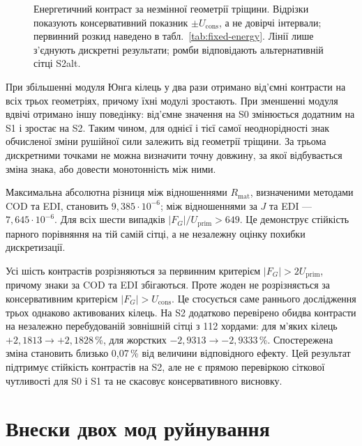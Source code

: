 \begin{figure}[htbp]
 \centering
 
 \caption{Енергетичний контраст за незмінної геометрії тріщини. Відрізки показують консервативний показник $\pm U_{\mathrm{cons}}$, а не довірчі інтервали; первинний розкид наведено в табл.~\ref{tab:fixed-energy}. Лінії лише з'єднують дискретні результати; ромби відповідають альтернативній сітці S2alt.}
 \label{fig:fixed-contrast}
\end{figure}

При збільшенні модуля Юнга кілець у два рази отримано від'ємні контрасти на всіх трьох геометріях, причому їхні модулі зростають. При зменшенні модуля вдвічі отримано іншу поведінку: від'ємне значення на S0 змінюється додатним на S1 і зростає на S2. Таким чином, для однієї і тієї самої неоднорідності знак обчисленої зміни рушійної сили залежить від геометрії тріщини. За трьома дискретними точками не можна визначити точну довжину, за якої відбувається зміна знака, або довести монотонність між ними.

Максимальна абсолютна різниця між відношеннями $R_{\mathrm{mat}}$, визначеними методами COD та EDI, становить $9{,}385\cdot10^{-6}$; між відношеннями за $J$ та EDI --- $7{,}645\cdot10^{-6}$. Для всіх шести випадків $|F_G|/U_{\mathrm{prim}}>649$. Це демонструє стійкість парного порівняння на тій самій сітці, а не незалежну оцінку похибки дискретизації.

Усі шість контрастів розрізняються за первинним критерієм $|F_G|>2U_{\mathrm{prim}}$, причому знаки за COD та EDI збігаються. Проте жоден не розрізняється за консервативним критерієм $|F_G|>U_{\mathrm{cons}}$. Це стосується саме раннього дослідження трьох однаково активованих кілець. На S2 додатково перевірено обидва контрасти на незалежно перебудованій зовнішній сітці з 112 хордами: для м'яких кілець $+2{,}1813\to+2{,}1828$\,\%, для жорстких $-2{,}9313\to-2{,}9333$\,\%. Спостережена зміна становить близько 0,07\,\% від величини відповідного ефекту. Цей результат підтримує стійкість контрастів на S2, але не є прямою перевіркою сіткової чутливості для S0 і S1 та не скасовує консервативного висновку.

\section{Внески двох мод руйнування}
\label{sec:fixed-modes}

